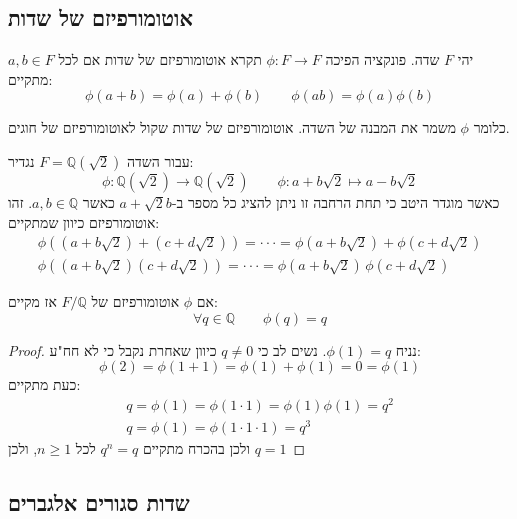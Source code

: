 \documentclass{tstextbook}
\begin{document}
\subsection{אוטומורפיזם של שדות}

\begin{definition}
יהי \(F\) שדה. פונקציה הפיכה \(\phi:F\to F\) תקרא אוטומורפיזם של שדות אם לכל \(a,b\in F\) מתקיים:
$$\phi(a+b)=\phi(a)+\phi(b)\qquad \phi(ab)=\phi(a)\phi(b)$$

\end{definition}
כלומר \(\phi\) משמר את המבנה של השדה. אוטומורפיזם של שדות שקול לאוטומורפיזם של חוגים.

\begin{example}
עבור השדה \(F=\mathbb{Q}\left( \sqrt{ 2 } \right)\) נגדיר:
$$\phi:\mathbb{Q} \left( \sqrt{ 2 } \right)\to\mathbb{Q} \left( \sqrt{ 2 } \right) \qquad \phi:a+b\sqrt{ 2 }\mapsto a-b\sqrt{ 2 }$$
כאשר מוגדר היטב כי תחת הרחבה זו ניתן להציג כל מספר ב-\(a+\sqrt{ 2 }b\) כאשר \(a,b \in \mathbb{Q}\). זהו אוטומורפיזם כיוון שמתקיים:
$$\begin{gather}\phi\left( \left( a+b{\sqrt{2}} \right)+\left( c+d{\sqrt{2}} \right) \right)=\cdot\cdot\cdot=\phi\left( a+b{\sqrt{2}} \right)+\phi\left( c+d{\sqrt{2}} \right)  \\\phi((a+b{\sqrt{2}})(c+d{\sqrt{2}}))=\cdot\cdot\cdot=\phi(a+b{\sqrt{2}})\,\phi(c+d{\sqrt{2}})
\end{gather}$$

\end{example}
\begin{proposition}
אם \(\phi\) אוטומורפיזם של \(F / \mathbb{Q}\) אז מקיים:
$$\forall q \in \mathbb{Q} \qquad \phi(q)=q$$

\end{proposition}
\begin{proof}
נניח \(\phi(1)=q\). נשים לב כי \(q\neq0\) כיוון שאחרת נקבל כי לא חח"ע:
$$\phi(2)=\phi(1+1)=\phi(1)+\phi(1)=0=\phi(1)$$
כעת מתקיים:
$$\begin{gather}q=\phi(1)=\phi\left( 1\cdot 1 \right)=\phi(1)\phi(1)=q^2  \\q=\phi(1)=\phi\left( 1\cdot 1 \cdot 1 \right)=q^3 
\end{gather}$$
ולכן בהכרח מתקיים \(q^n=q\) לכל \(n\geq 1\), ולכן \(q=1\)

\end{proof}
\subsection{שדות סגורים אלגברים}
\end{document}
